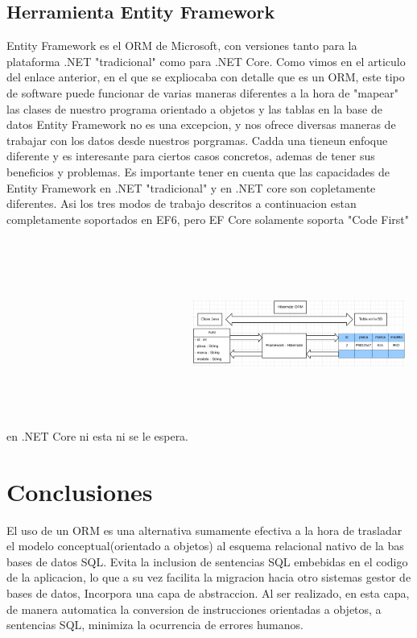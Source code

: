 \documentclass[twoside,twocolumn]{article}
\begin{document}
 \subsection{Herramienta Entity Framework}
 Entity Framework es el ORM de Microsoft, con versiones tanto para la plataforma .NET "tradicional"
 como para .NET Core. 
 Como vimos en el articulo del enlace anterior, en el que se expliocaba con detalle que es un ORM, este tipo de software
 puede funcionar de varias maneras diferentes a la hora de "mapear" las clases de nuestro programa orientado a objetos y las tablas en la 
 base de datos 
 Entity Framework no es una excepcion, y nos ofrece diversas maneras de trabajar con los datos desde nuestros porgramas. 
 Cadda una tieneun enfoque diferente y es interesante para ciertos casos concretos, ademas de tener sus beneficios y problemas.
 Es importante tener en cuenta que las capacidades de Entity Framework en .NET "tradicional" y en .NET core son copletamente 
 diferentes.
Asi los tres modos de trabajo descritos a continuacion estan completamente soportados en EF6, pero EF Core solamente soporta "Code First" en .NET
Core ni esta ni se le espera.
 \includegraphics[width=7cm, height=7cm]{imagenes/hibernate.jpg}
\section{Conclusiones}
El uso de un ORM es una alternativa sumamente efectiva a la hora de trasladar el modelo conceptual(orientado a objetos)
al esquema relacional nativo de la bas bases de datos SQL. Evita la inclusion de sentencias SQL embebidas en el codigo de la aplicacion, lo que a su vez facilita la migracion
hacia otro sistemas gestor de bases de datos, Incorpora una capa de abstraccion. Al ser realizado, en esta capa, de manera automatica la conversion de 
instrucciones orientadas a objetos, a sentencias SQL, minimiza la ocurrencia de errores humanos.
\end{document}
